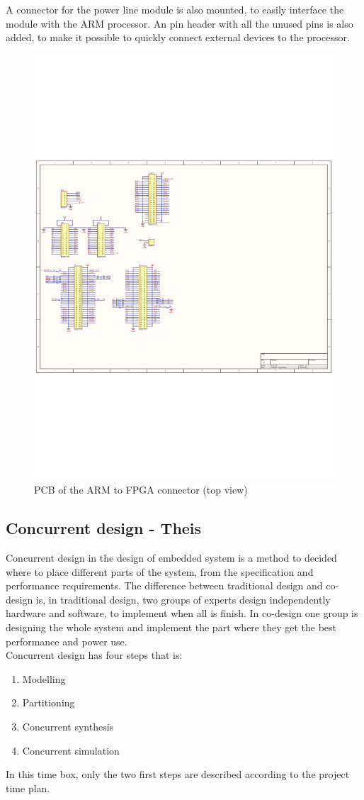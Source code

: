 A connector for the power line module is also mounted, to easily interface the module with the ARM processor. An pin header with all the unused pins is also added, to make it possible to quickly connect external devices to the processor. 
\begin{figure}[H]
	\begin{centering}
		 \includegraphics[height=0.8\textwidth,page=2,angle=90]{content/appendix/eudp/images/dig_to_ea_v0_1}
		\caption{PCB of the ARM to FPGA connector (top view)}
	\end{centering}
\end{figure}

\subsection{Concurrent design - Theis}
Concurrent design in the design of embedded system is a method to decided where to place different parts of the system, from the specification and performance requirements. The difference between traditional design and co-design is, in traditional design, two groups of experts design independently hardware and software, to implement when all is finish. In co-design one group is designing the whole system and implement the part where they get the best performance and power use.\\
Concurrent design has four steps that is:
\begin{enumerate}
	\item Modelling
	\item Partitioning
	\item Concurrent synthesis
	\item Concurrent simulation
\end{enumerate}
In this time box, only the two first steps are described according to the project time plan.


